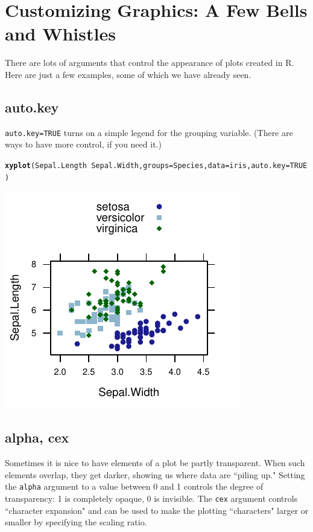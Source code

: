 \documentclass[twoside]{book}\usepackage[]{graphicx}\usepackage[]{xcolor}
\makeatletter
\def\maxwidth{ %
  \ifdim\Gin@nat@width>\linewidth
    \linewidth
  \else
    \Gin@nat@width
  \fi
}
\newcommand{\hlnum}[1]{\textcolor[rgb]{0.686,0.059,0.569}{#1}}%
\newcommand{\hlopt}[1]{\textcolor[rgb]{0,0,0}{#1}}%
\newcommand{\hlstd}[1]{\textcolor[rgb]{0.345,0.345,0.345}{#1}}%
\newcommand{\hlkwc}[1]{\textcolor[rgb]{0.333,0.667,0.333}{#1}}%
\newcommand{\hlkwd}[1]{\textcolor[rgb]{0.737,0.353,0.396}{\textbf{#1}}}%
\newenvironment{kframe}{%
 \def\at@end@of@kframe{}%
 \ifinner\ifhmode%
  \def\at@end@of@kframe{\end{minipage}}%
  \begin{minipage}{\columnwidth}%
 \fi\fi%
 \def\FrameCommand##1{\hskip\@totalleftmargin \hskip-\fboxsep
 \colorbox{shadecolor}{##1}\hskip-\fboxsep
     \hskip-\linewidth \hskip-\@totalleftmargin \hskip\columnwidth}%
 \MakeFramed {\advance\hsize-\width
   \@totalleftmargin\z@ \linewidth\hsize
   \@setminipage}}%
 {\par\unskip\endMakeFramed%
 \at@end@of@kframe}
\newenvironment{knitrout}{}{} %
\newcommand{\option}[1]{{\color{brown!80!black}\texttt{#1}}}
\newcommand{\argument}[1]{{\color{brown!80!black}\texttt{#1}}}
\def\R{{\sf R}}
\newcounter{example}[section]
\makeatother
\begin{document}
\section{Customizing Graphics: A Few Bells and Whistles}
There are lots of arguments that control the appearance of plots created in \R.  Here are just a
few examples, some of which we have already seen.

\subsection{auto.key}
\option{auto.key=TRUE} turns on a simple legend for the grouping variable.  
(There are ways to have more control, if you need it.)
\begin{knitrout}
\color{fgcolor}\begin{kframe}
\begin{alltt}
\hlkwd{xyplot}\hlstd{(Sepal.Length} \hlopt{~} \hlstd{Sepal.Width,} \hlkwc{groups} \hlstd{= Species,} \hlkwc{data} \hlstd{= iris,} \hlkwc{auto.key} \hlstd{=} \hlnum{TRUE}\hlstd{)}
\end{alltt}
\end{kframe}

{\centering \includegraphics[width=\maxwidth]{figures/fig-iris-xyplot-key-1} 

}



\end{knitrout}

\subsection{alpha, cex}
Sometimes it is nice to have elements of a plot be partly transparent.  When
such elements overlap, they get darker, showing us where data are ``piling up."
Setting the \argument{alpha} argument to a value between 0 and 1 controls the
degree of transparency: 1 is completely opaque, 0 is invisible.  The
\argument{cex} argument controls ``character expansion" and can be used to make
the plotting ``characters" larger or smaller by specifying the scaling ratio.
\end{document}
